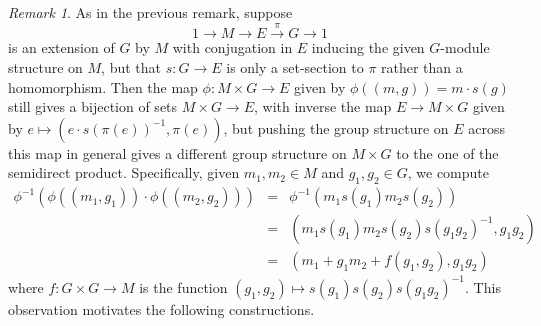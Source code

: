 \documentclass[11pt]{amsart}
\numberwithin{equation}{section}
\theoremstyle{remark}
\newtheorem{remark}[equation]{Remark}
\theoremstyle{remark}
\theoremstyle{remark}
\theoremstyle{definition}
\theoremstyle{definition}
\theoremstyle{definition}
\theoremstyle{definition}
\theoremstyle{definition}
\theoremstyle{definition}
\begin{document}
\begin{remark} \label{set section bijection}
As in the previous remark, suppose \[1\longrightarrow M \longrightarrow E \stackrel{\pi}{\longrightarrow} G\longrightarrow 1\]
is an extension of $G$ by $M$ with conjugation in $E$ inducing the given $G$-module structure on $M$, but that $s:G \rightarrow E$ is only a set-section to $\pi$ rather than a homomorphism. Then the  map $\phi: M\times G \rightarrow E $ given by 
$\phi\left((m,g)\right)= m\cdot s(g)$
still gives a bijection of sets $ M\times G\rightarrow E$, with inverse the map $E\rightarrow M\times G$ given by $e\mapsto \left(e\cdot s(\pi(e))^{-1},\pi(e)\right)$, but pushing the group structure on $E$ across this map in general gives a different group structure on $M\times G$ to the one of the semidirect product. Specifically, given $m_1,m_2\in M$ and $g_1,g_2\in G$, we compute
\begin{eqnarray*}\phi^{-1}\left(\phi\left((m_1,g_1)\right)\cdot \phi\left((m_2,g_2)\right)\right)&=&\phi^{-1}\left(m_1s(g_1)m_2s(g_2)\right)\\
&=&\left(m_1s(g_1)m_2s(g_2)s(g_1g_2)^{-1},g_1g_2\right)\\&=&\left(m_1+g_1m_2+f(g_1,g_2),g_1g_2\right)\end{eqnarray*}
where $f:G\times G\rightarrow M$ is the function $(g_1,g_2)\mapsto s(g_1)s(g_2)s(g_1g_2)^{-1}$. This observation motivates the following constructions.
\end{remark}
\end{document}
